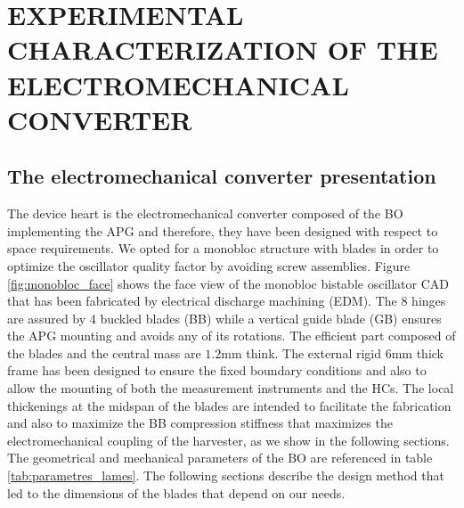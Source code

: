 \documentclass[3p,twocolumn,preprint]{elsarticle}
\begin{document}
\section{EXPERIMENTAL CHARACTERIZATION OF THE \mbox{ELECTROMECHANICAL} CONVERTER}
\label{sec:EXPERIMENTAL CHARACTERIZATIONS OF THE ELECTROMECHANICAL CONVERTER}
	\subsection{The electromechanical converter presentation}	
	\label{The electromechanical converter presentation}
The device heart is the electromechanical converter composed of the BO implementing the APG and therefore, they have been designed with respect to space requirements. We opted for a monobloc structure with blades in order to optimize the oscillator quality factor by avoiding screw assemblies. Figure \ref{fig:monobloc_face} shows the face view of the monobloc bistable oscillator CAD that has been fabricated by electrical discharge machining (EDM). The 8 hinges are assured by 4 buckled blades (BB) while a vertical guide blade (GB) ensures the APG mounting and avoids any of its rotations. The efficient part composed of the blades and the central mass are $1.2$mm think. The external rigid $6$mm thick frame has been designed to ensure the fixed boundary conditions and also to allow the mounting of both the measurement instruments and the HCs. The local thickenings at the midspan of the blades are intended to facilitate the fabrication and also to maximize the BB compression stiffness that maximizes the electromechanical coupling of the harvester, as we show in the following sections. The geometrical and mechanical parameters of the BO are referenced in table \ref{tab:parametres_lames}. The following sections describe the design method that led to the dimensions of the blades that depend on our needs.
\end{document}
